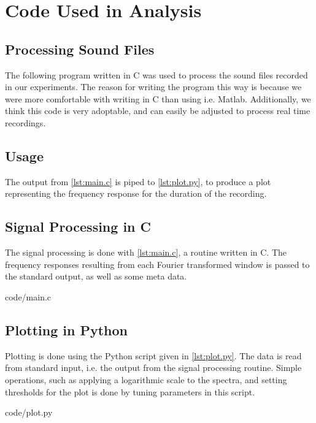 \chapter{Code Used in Analysis}\label{apx:code}

\section{Processing Sound Files}
The following program written in C was used to process the sound files recorded in our experiments. 
The reason for writing the program this way is because we were more comfortable with writing in C than using i.e. Matlab.
Additionally, we think this code is very adoptable, and can easily be adjusted to process real time recordings.

\section{Usage}
The output from \autoref{lst:main.c} is piped to \autoref{lst:plot.py}, to produce a plot representing the frequency response for the duration of the recording. 


\section{Signal Processing in C}
The signal processing is done with \autoref{lst:main.c}, a routine written in C.
The frequency responses resulting from each Fourier transformed window is passed to the standard output, as well as some meta data.

\begin{lstinputlisting}[language=C, caption={main.c - Compute Power Spectrum of a Sound File}, label={lst:main.c}]{code/main.c}
\end{lstinputlisting}


\section{Plotting in Python}
Plotting is done using the Python script given in \autoref{lst:plot.py}.
The data is read from standard input, i.e. the output from the signal processing routine.
Simple operations, such as applying a logarithmic scale to the spectra, and setting thresholds for the plot is done by tuning parameters in this script.

\begin{lstinputlisting}[language=Python, caption={plot.py - Plot frequency spectra on time axis}, label={lst:plot.py}]{code/plot.py}
\end{lstinputlisting}
